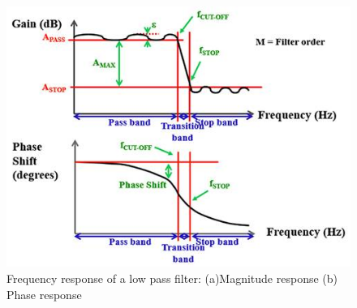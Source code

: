 \begin{figure}[t!p]
\centering
\includegraphics[width=.8\textwidth]{figures/chapter_background/Filter_freqResponse.jpg}
\caption{Frequency response of a low pass filter: (a)Magnitude response (b) Phase response}
\label{fig:Filter_freqResponse}
\end{figure}

